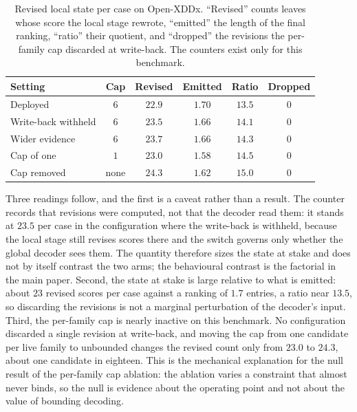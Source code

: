 \documentclass[letterpaper]{article}
\begin{document}
\begin{table}[tb]
\centering
\footnotesize
\setlength{\tabcolsep}{3pt}
\begin{tabular}{@{}lccccc@{}}
\toprule
Setting & Cap & Revised & Emitted & Ratio & Dropped \\
\midrule
Deployed            & $6$  & $22.9$ & $1.70$ & $13.5$ & $0$ \\
Write-back withheld & $6$  & $23.5$ & $1.66$ & $14.1$ & $0$ \\
Wider evidence      & $6$  & $23.7$ & $1.66$ & $14.3$ & $0$ \\
Cap of one          & $1$  & $23.0$ & $1.58$ & $14.5$ & $0$ \\
Cap removed         & none & $24.3$ & $1.62$ & $15.0$ & $0$ \\
\bottomrule
\end{tabular}
\caption{Revised local state per case on Open-XDDx. ``Revised'' counts leaves whose score the local stage rewrote, ``emitted'' the length of the final ranking, ``ratio'' their quotient, and ``dropped'' the revisions the per-family cap discarded at write-back. The counters exist only for this benchmark.}
\label{tab:propagation}
\end{table}

Three readings follow, and the first is a caveat rather than a result.
The counter records that revisions were computed, not that the decoder read them: it stands at $23.5$ per case in the configuration where the write-back is withheld, because the local stage still revises scores there and the switch governs only whether the global decoder sees them.
The quantity therefore sizes the state at stake and does not by itself contrast the two arms; the behavioural contrast is the factorial in the main paper.
Second, the state at stake is large relative to what is emitted: about $23$ revised scores per case against a ranking of $1.7$ entries, a ratio near $13.5$, so discarding the revisions is not a marginal perturbation of the decoder's input.
Third, the per-family cap is nearly inactive on this benchmark.
No configuration discarded a single revision at write-back, and moving the cap from one candidate per live family to unbounded changes the revised count only from $23.0$ to $24.3$, about one candidate in eighteen.
This is the mechanical explanation for the null result of the per-family cap ablation: the ablation varies a constraint that almost never binds, so the null is evidence about the operating point and not about the value of bounding decoding.
\end{document}
